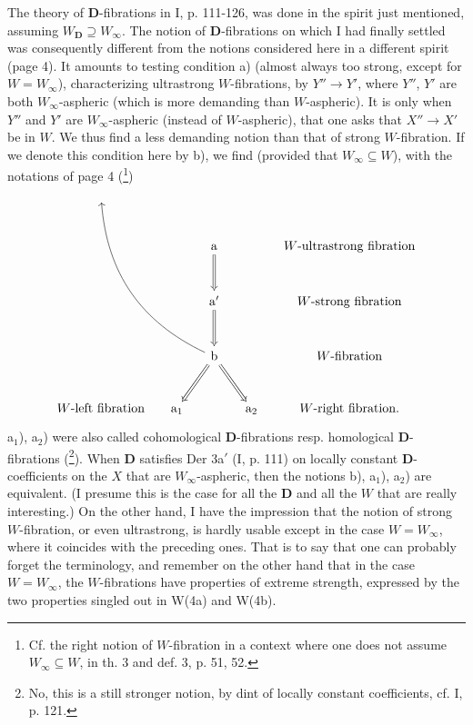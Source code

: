 The theory of \textbf{D}-fibrations in I, p. 111-126, was done in the spirit just mentioned, assuming $W_{\mathbf{D}} \supseteq W_\infty$. The notion of \textbf{D}-fibrations on which I had finally settled was consequently different from the notions considered here in a different spirit (page 4). It amounts to testing condition a) (almost always too strong, except for $W = W_\infty$), characterizing ultrastrong $W$-fibrations, by $Y'' \longrightarrow Y'$, where $Y''$, $Y'$ are both $W_\infty$-aspheric (which is more demanding than $W$-aspheric). It is only when $Y''$ and $Y'$ are $W_\infty$-aspheric (instead of $W$-aspheric), that one asks that $X'' \longrightarrow X'$ be in $W$. We thus find a less demanding notion than that of strong $W$-fibration. If we denote this condition here by b), we find (provided that $W_\infty \subseteq W$), with the notations of page 4 (\footnote[39]{Cf. the right notion of $W$-fibration in a context where one does not assume $W_\infty \subseteq W$, in th. 3 and def. 3, p. 51, 52.}) %
\[
\begin{tikzcd}[column sep=small, row sep=large]
{} & & & & \\
& & \mathrm{a} \arrow[d, Rightarrow] & & W\text{-ultrastrong fibration} \\
& & \mathrm{a}' \arrow[d, Rightarrow] & & W\text{-strong fibration} \\
& & \mathrm{b} \arrow[dl, Rightarrow] \arrow[dr, Rightarrow] \arrow[uuull, bend left=30] & & W\text{-fibration} \\
W\text{-left fibration} & \mathrm{a}_1 & & \mathrm{a}_2 & W\text{-right fibration.}
\end{tikzcd}
\]
a$_1$), a$_2$) were also called cohomological \textbf{D}-fibrations resp. homological \textbf{D}-fibrations (\footnote[40]{No, this is a still stronger notion, by dint of locally constant coefficients, cf. I, p. 121.}). When \textbf{D} satisfies Der 3a$'$ (I, p. 111) on locally constant \textbf{D}-coefficients on the $X$ that are $W_\infty$-aspheric, then the notions b), a$_1$), a$_2$) are equivalent. (I presume this is the case for all the \textbf{D} and all the $W$ that are really interesting.) On the other hand, I have the impression that the notion of strong $W$-fibration, or even ultrastrong, is hardly usable except in the case $W = W_\infty$, where it coincides with the preceding ones. That is to say that one can probably forget the terminology, and remember on the other hand that in the case $W = W_\infty$, the %
$W$-fibrations have properties of extreme strength, expressed by the two properties singled out in W(4a) and W(4b).

